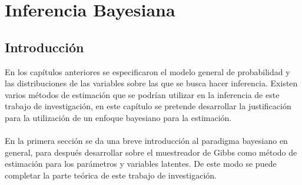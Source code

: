 \chapter{Inferencia Bayesiana}
\section{Introducci\'on}
En los cap\'itulos anteriores se especificaron el modelo general de probabilidad y las distribuciones de las variables sobre las que se busca hacer inferencia. Existen varios m\'etodos de estimaci\'on que se podr\'ian utilizar en la inferencia de este trabajo de investigaci\'on, en este cap\'itulo se pretende desarrollar la justificaci\'on para la utilizaci\'on de un enfoque bayesiano para la estimaci\'on.\\
\\
En la primera secci\'on se da una breve introducci\'on al paradigma bayesiano en general, para despu\'es desarrollar sobre el muestreador de Gibbs como m\'etodo de estimaci\'on para los par\'ametros y variables latentes. De este modo se puede completar la parte te\'orica de este trabajo de investigaci\'on.  
